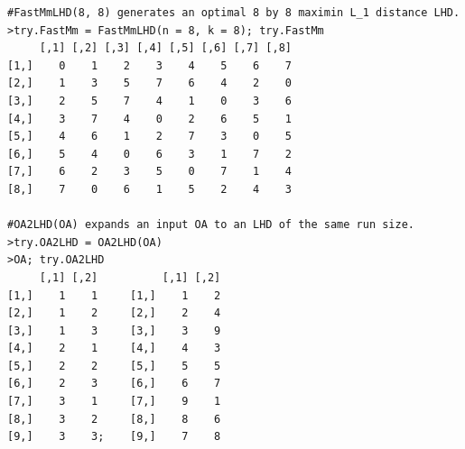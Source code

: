 {\small
	\begin{verbatim}
#FastMmLHD(8, 8) generates an optimal 8 by 8 maximin L_1 distance LHD.
>try.FastMm = FastMmLHD(n = 8, k = 8); try.FastMm
     [,1] [,2] [,3] [,4] [,5] [,6] [,7] [,8]
[1,]    0    1    2    3    4    5    6    7
[2,]    1    3    5    7    6    4    2    0
[3,]    2    5    7    4    1    0    3    6
[4,]    3    7    4    0    2    6    5    1
[5,]    4    6    1    2    7    3    0    5
[6,]    5    4    0    6    3    1    7    2
[7,]    6    2    3    5    0    7    1    4
[8,]    7    0    6    1    5    2    4    3

#OA2LHD(OA) expands an input OA to an LHD of the same run size.
>try.OA2LHD = OA2LHD(OA)
>OA; try.OA2LHD
     [,1] [,2]          [,1] [,2]
[1,]    1    1     [1,]    1    2
[2,]    1    2     [2,]    2    4
[3,]    1    3     [3,]    3    9
[4,]    2    1     [4,]    4    3
[5,]    2    2     [5,]    5    5
[6,]    2    3     [6,]    6    7
[7,]    3    1     [7,]    9    1
[8,]    3    2     [8,]    8    6
[9,]    3    3;    [9,]    7    8
	\end{verbatim}
}


